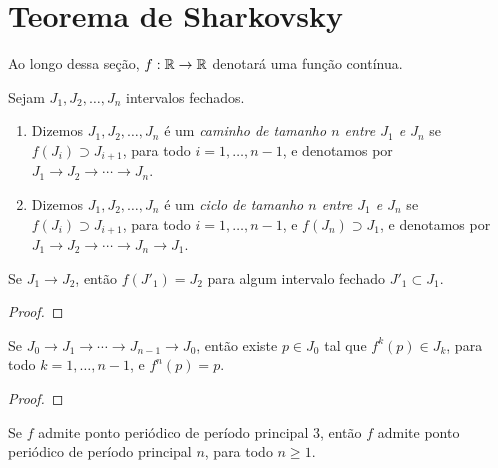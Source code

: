 
\section{Teorema de Sharkovsky}
Ao longo dessa seção, $f: \mathbb{R} \to \mathbb{R}$ denotará uma função contínua.
\begin{definition}
Sejam $J_1, J_2, \dots, J_n$ intervalos fechados.
\begin{enumerate}
\item Dizemos $J_1, J_2, \dots, J_n$ é um \textit{caminho de tamanho $n$ entre $J_1$ e $J_n$} se $f(J_i) \supset J_{i+1}$, para todo $i = 1, \dots, n-1$, e denotamos por $J_1 \longrightarrow J_2 \longrightarrow \cdots \longrightarrow J_n$.

\item Dizemos $J_1, J_2, \dots, J_n$ é um \textit{ciclo de tamanho $n$ entre $J_1$ e $J_n$} se $f(J_i) \supset J_{i+1}$, para todo $i = 1, \dots, n-1$, e $f(J_n) \supset J_1$, e denotamos por $J_1 \longrightarrow J_2 \longrightarrow \cdots \longrightarrow J_n \longrightarrow J_1$.
\end{enumerate}

\begin{proposition}
Se $J_1 \longrightarrow J_2$, então $f(J'_1) = J_2$ para algum intervalo fechado $J'_1 \subset J_1$.
\end{proposition}
\begin{proof}

\end{proof}

\begin{lemma}
Se $J_0 \longrightarrow J_1 \longrightarrow \cdots \longrightarrow J_{n-1} \longrightarrow J_0$, então existe $p \in J_0$ tal que $f^k(p) \in J_k$, para todo $k = 1, \dots, n-1$, e $f^n(p) = p$.
\end{lemma}

\begin{proof}

\end{proof}

\begin{theorem}
Se $f$ admite ponto periódico de período principal $3$, então $f$ admite ponto periódico de período principal $n$, para todo $n \geq 1$.
\end{theorem}


\end{definition}
